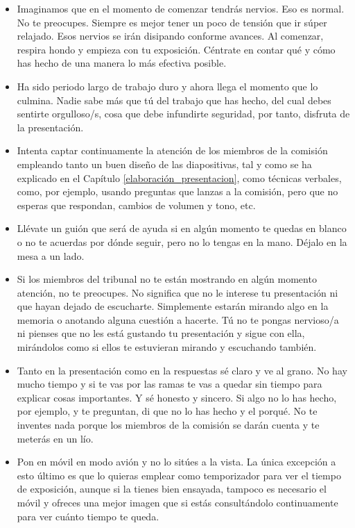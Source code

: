 \begin{itemize}
    \item Imaginamos que en el momento de comenzar tendrás nervios. Eso es normal. No te preocupes. Siempre es mejor tener un poco de tensión que ir súper relajado. Esos nervios se irán disipando conforme avances. Al comenzar, respira hondo y empieza con tu exposición. Céntrate en contar qué y cómo has hecho de una manera lo más efectiva posible.

    \item Ha sido periodo largo de trabajo duro y ahora llega el momento que lo culmina. Nadie sabe más que tú del trabajo que has hecho, del cual debes sentirte orgulloso/s, cosa que debe infundirte seguridad, por tanto, disfruta de la presentación. 

    \item Intenta captar continuamente la atención de los miembros de la comisión empleando tanto un buen diseño de las diapositivas, tal y como se ha explicado en el Capítulo \ref{elaboración_presentacion}, como técnicas verbales, como, por ejemplo, usando preguntas que lanzas a la comisión, pero que no esperas que respondan, cambios de volumen y tono, etc.

    \item Llévate un guión que será de ayuda si en algún momento te quedas en blanco o no te acuerdas por dónde seguir, pero no lo tengas en la mano. Déjalo en la mesa a un lado.

    \item Si los miembros del tribunal no te están mostrando en algún momento atención, no te preocupes. No significa que no le interese tu presentación ni que hayan dejado de escucharte. Simplemente estarán mirando algo en la memoria o anotando alguna cuestión a hacerte. Tú no te pongas nervioso/a ni pienses que no les está gustando tu presentación y sigue con ella, mirándolos como si ellos te estuvieran mirando y escuchando también.

    \item Tanto en la presentación como en la respuestas sé claro y ve al grano. No hay mucho tiempo y si te vas por las ramas te vas a quedar sin tiempo para explicar cosas importantes. Y sé honesto y sincero. Si algo no lo has hecho, por ejemplo, y te preguntan, di que no lo has hecho y el porqué. No te inventes nada porque los miembros de la comisión se darán cuenta y te meterás en un lío.

    \item Pon en móvil en modo avión y no lo sitúes a la vista. La única excepción a esto último es que lo quieras emplear como temporizador para ver el tiempo de exposición, aunque si la tienes bien ensayada, tampoco es necesario el móvil y ofreces una mejor imagen que si estás consultándolo continuamente para ver cuánto tiempo te queda.
\end{itemize}

